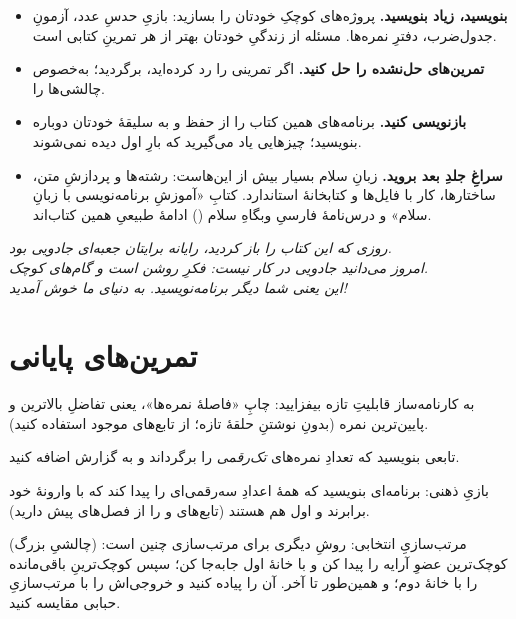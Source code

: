 \begin{itemize}
  \item \textbf{بنویسید، زیاد بنویسید.} پروژه‌های کوچکِ خودتان را
        بسازید: بازیِ حدسِ عدد، آزمونِ جدول‌ضرب، دفترِ نمره‌ها. مسئله
        از زندگیِ خودتان بهتر از هر تمرینِ کتابی است.
  \item \textbf{تمرین‌های حل‌نشده را حل کنید.} اگر تمرینی را رد
        کرده‌اید، برگردید؛ به‌خصوص چالشی‌ها را.
  \item \textbf{بازنویسی کنید.} برنامه‌های همین کتاب را از حفظ و به
        سلیقهٔ خودتان دوباره بنویسید؛ چیزهایی یاد می‌گیرید که بارِ اول
        دیده نمی‌شوند.
  \item \textbf{سراغِ جلدِ بعد بروید.} زبانِ سلام بسیار بیش از این‌هاست:
        رشته‌ها و پردازشِ متن، ساختارها، کار با فایل‌ها و کتابخانهٔ
        استاندارد. کتابِ «آموزشِ برنامه‌نویسی با زبانِ سلام» و
        درس‌نامهٔ فارسیِ وبگاهِ سلام () ادامهٔ
        طبیعیِ همین کتاب‌اند.
\end{itemize}

\begin{center}
\vspace{0.5cm}
\emph{روزی که این کتاب را باز کردید، رایانه برایتان جعبه‌ای جادویی بود.\\
امروز می‌دانید جادویی در کار نیست: فکرِ روشن است و گام‌های کوچک.\\
این یعنی شما دیگر برنامه‌نویسید. به دنیای ما خوش آمدید!}
\vspace{0.5cm}
\end{center}

\section{تمرین‌های پایانی}

\exercise به کارنامه‌ساز قابلیتِ تازه بیفزایید: چاپِ «فاصلهٔ نمره‌ها»،
یعنی تفاضلِ بالاترین و پایین‌ترین نمره (بدونِ نوشتنِ حلقهٔ تازه؛ از
تابع‌های موجود استفاده کنید).

\exercise تابعی بنویسید که تعدادِ نمره‌های \emph{تک‌رقمی} را برگرداند و
به گزارش اضافه کنید.

\exercise بازیِ ذهنی: برنامه‌ای بنویسید که همهٔ اعدادِ سه‌رقمی‌ای را
پیدا کند که با وارونهٔ خود برابرند و اول هم هستند (تابع‌های 
و  را از فصل‌های پیش دارید).

\exercise (چالشیِ بزرگ) مرتب‌سازیِ انتخابی: روشِ دیگری برای مرتب‌سازی
چنین است: کوچک‌ترین عضوِ آرایه را پیدا کن و با خانهٔ اول جابه‌جا کن؛
سپس کوچک‌ترینِ باقی‌مانده را با خانهٔ دوم؛ و همین‌طور تا آخر. آن را
پیاده کنید و خروجی‌اش را با مرتب‌سازیِ حبابی مقایسه کنید.
